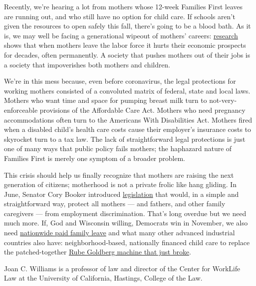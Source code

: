 Recently, we're hearing a lot from mothers whose 12-week Families First
leaves are running out, and who still have no option for child care. If
schools aren't given the resources to open safely this fall, there's
going to be a blood bath. As it is, we may well be facing a generational
wipeout of mothers' careers:
\href{https://www.americanprogress.org/issues/early-childhood/reports/2016/06/21/139731/calculating-the-hidden-cost-of-interrupting-a-career-for-child-care/}{research}
shows that when mothers leave the labor force it hurts their economic
prospects for decades, often permanently. A society that pushes mothers
out of their jobs is a society that impoverishes both mothers and
children.

We're in this mess because, even before coronavirus, the legal
protections for working mothers consisted of a convoluted matrix of
federal, state and local laws. Mothers who want time and space for
pumping breast milk turn to not-very-enforceable provisions of the
Affordable Care Act. Mothers who need pregnancy accommodations often
turn to the Americans With Disabilities Act. Mothers fired when a
disabled child's health care costs cause their employer's insurance
costs to skyrocket turn to a tax law. The lack of straightforward legal
protections is just one of many ways that public policy fails mothers;
the haphazard nature of Families First is merely one symptom of a
broader problem.

This crisis should help us finally recognize that mothers are raising
the next generation of citizens; motherhood is not a private frolic like
hang gliding. In June, Senator Cory Booker introduced
\href{https://www.insidernj.com/press-release/sen-booker-introduces-legislation-protecting-family-caregivers-discrimination/}{legislation}
that would, in a simple and straightforward way, protect all mothers ---
and fathers, and other family caregivers --- from employment
discrimination. That's long overdue but we need much more. If, God and
Wisconsin willing, Democrats win in November, we also need
\href{https://www.pewresearch.org/fact-tank/2019/12/16/u-s-lacks-mandated-paid-parental-leave/}{nationwide
paid family leave} and what many other advanced industrial countries
also have: neighborhood-based, nationally financed child care to replace
the patched-together
\href{https://news.bloomberglaw.com/daily-labor-report/without-child-care-back-to-work-parents-have-few-legal-options}{Rube
Goldberg machine that just broke}.

Joan C. Williams is a professor of law and director of the Center for
WorkLife Law at the University of California, Hastings, College of the
Law.

